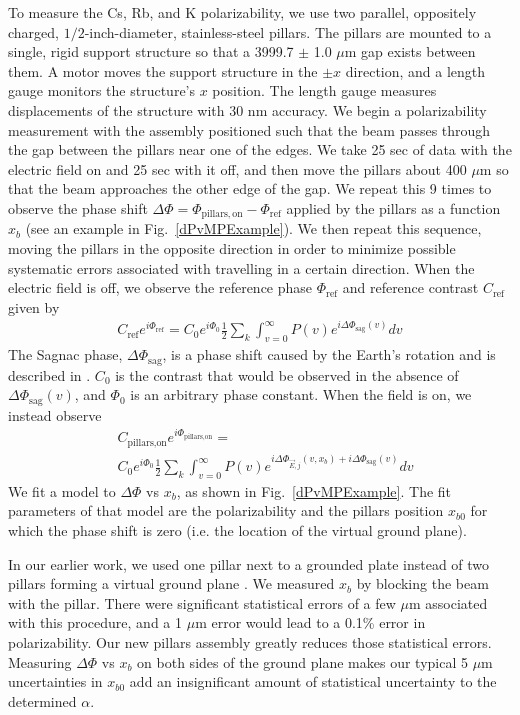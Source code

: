 \documentclass[twocolumn,pra,showpacs,superscriptaddress,longbibliography]{revtex4-1}   %
\newcommand{\figref}[1]{Fig.~\ref{#1}}
\newcommand{\dphisag}{\Delta\Phi_{\mathrm{sag}}}
\begin{document}
To measure the Cs, Rb, and K polarizability, we use two parallel, oppositely charged, $1/2$-inch-diameter, stainless-steel pillars. The pillars are mounted to a single, rigid support structure so that a 3999.7 $\pm$ 1.0 $\mu$m gap exists between them. A motor moves the support structure in the $\pm x$ direction, and a length gauge monitors the structure's $x$ position. The length gauge measures displacements of the structure with 30 nm accuracy. 
We begin a polarizability measurement with the assembly positioned such that the beam passes through the gap between the pillars near one of the edges.
We take 25 sec of data with the electric field on and 25 sec with it off, and then move the pillars about 400 $\mu$m so that the beam approaches the other edge of the gap. We repeat this 9 times to 
observe the phase shift $\Delta\Phi = \Phi_{\mathrm{pillars,on}} - \Phi_{\mathrm{ref}}$ applied by the pillars as a function $x_b$ (see an example in \figref{dPvMPExample}). 
We then repeat this sequence, moving the pillars in the opposite direction in order to minimize possible systematic errors associated with travelling in a certain direction.
When the electric field is off, we observe the reference phase $\Phi_{\mathrm{ref}}$ and reference contrast $C_{\mathrm{ref}}$ given by 
\begin{align}
	C_{\mathrm{ref}}e^{i\Phi_{\mathrm{ref}}} = 
		C_0e^{i\Phi_0} \frac{1}{2} \sum_k
		\int_{v=0}^{\infty} P(v)
		e^{i\dphisag(v)} 
		dv
	\label{CPPolesRef}
\end{align}
The Sagnac phase, $\dphisag$, is a phase shift caused by the Earth's rotation and is described in \cite{Holmgren2010,Lenef1997,Jacquey2008}.
$C_0$ is the contrast that would be observed in the absence of $\dphisag(v)$, and $\Phi_0$ is an arbitrary phase constant.
When the field is on, we instead observe
\begin{align}
	& C_{\textrm{pillars,on}}e^{i\Phi_{\textrm{pillars,on}}} = \nonumber \\
		& C_0e^{i\Phi_0}		
		\frac{1}{2} \sum_k
		\int_{v=0}^{\infty} P(v)
		e^{
			i\Delta\Phi_{\vec{E},j}(v,x_b) + 
			i\dphisag(v)
		} 
		dv
	\label{CPPolesEOn}
\end{align}
We fit a model to $\Delta\Phi$ vs $x_b$, as shown in \figref{dPvMPExample}. The fit parameters of that model are the polarizability and the pillars position $x_{b0}$ for which the phase shift is zero (i.e. the location of the virtual ground plane). 

In our earlier work, we used one pillar next to a grounded plate instead of two pillars forming a virtual ground plane \cite{Holmgren2010}. We measured $x_b$ by blocking the beam with the pillar. There were significant statistical errors of a few $\mu$m associated with this procedure, and a 1 $\mu$m error would lead to a 0.1\% error in polarizability. 
Our new pillars assembly greatly reduces those statistical errors. Measuring $\Delta\Phi$ vs $x_b$ on both sides of the ground plane makes our typical 5 $\mu$m uncertainties in $x_{b0}$ add an insignificant amount of 
statistical uncertainty to the determined $\alpha$.
\end{document}
